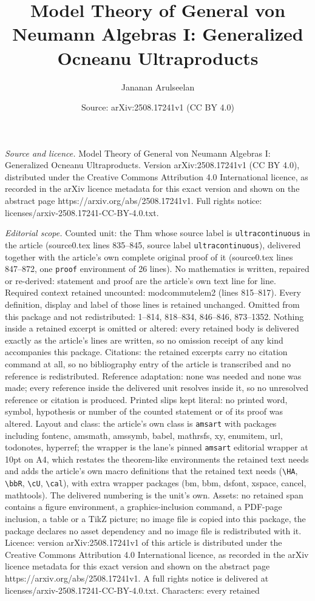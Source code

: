 \documentclass[10pt,a4paper]{amsart}
\title[Model Theory of General von Neumann Algebras I: Generalized ]{Model Theory of General von Neumann Algebras I: Generalized Ocneanu Ultraproducts}
\author{Jananan Arulseelan}
\date{Source: arXiv:2508.17241v1 (CC BY 4.0)}
\begin{document}
\maketitle

\noindent\emph{Source and licence.} Model Theory of General von Neumann Algebras I: Generalized Ocneanu Ultraproducts. Version arXiv:2508.17241v1 (CC BY 4.0), distributed under the Creative Commons Attribution 4.0 International licence, as recorded in the arXiv licence metadata for this exact version and shown on the abstract page https://arxiv.org/abs/2508.17241v1. Full rights notice: licenses/arxiv-2508.17241-CC-BY-4.0.txt.\par\smallskip

\noindent\textit{Editorial scope.} Counted unit: the Thm whose source label is \texttt{ultracontinuous} in the article (source0.tex lines 835--845, source label \texttt{ultracontinuous}), delivered together with the article's own complete original proof of it (source0.tex lines 847--872, one \texttt{proof} environment of 26 lines). No mathematics is written, repaired or re-derived: statement and proof are the article's own text line for line. Required context retained uncounted: modcommutelem2 (lines 815--817). Every definition, display and label of those lines is retained unchanged. Omitted from this package and not redistributed: 1--814, 818--834, 846--846, 873--1352. Nothing inside a retained excerpt is omitted or altered: every retained body is delivered exactly as the article's lines are written, so no omission receipt of any kind accompanies this package. Citations: the retained excerpts carry no citation command at all, so no bibliography entry of the article is transcribed and no reference is redistributed. Reference adaptation: none was needed and none was made; every reference inside the delivered unit resolves inside it, so no unresolved reference or citation is produced. Printed slips kept literal: no printed word, symbol, hypothesis or number of the counted statement or of its proof was altered. Layout and class: the article's own class is \texttt{amsart} with packages including fontenc, amsmath, amssymb, babel, mathrsfs, xy, enumitem, url, todonotes, hyperref; the wrapper is the lane's pinned \texttt{amsart} editorial wrapper at 10pt on A4, which restates the theorem-like environments the retained text needs and adds the article's own macro definitions that the retained text needs (\texttt{\textbackslash HA}, \texttt{\textbackslash bbR}, \texttt{\textbackslash cU}, \texttt{\textbackslash cal}), with extra wrapper packages (bm, bbm, dsfont, xspace, cancel, mathtools). The delivered numbering is the unit's own. Assets: no retained span contains a figure environment, a graphics-inclusion command, a PDF-page inclusion, a table or a TikZ picture; no image file is copied into this package, the package declares no asset dependency and no image file is redistributed with it. Licence: version arXiv:2508.17241v1 of this article is distributed under the Creative Commons Attribution 4.0 International licence, as recorded in the arXiv licence metadata for this exact version and shown on the abstract page https://arxiv.org/abs/2508.17241v1. A full rights notice is delivered at licenses/arxiv-2508.17241-CC-BY-4.0.txt. Characters: every retained 
\end{document}
